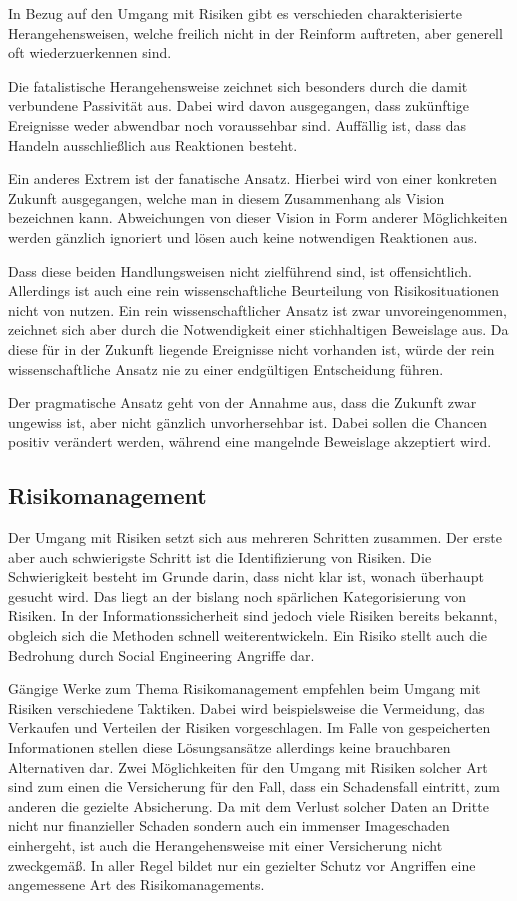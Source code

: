 In Bezug auf den Umgang mit Risiken gibt es verschieden charakterisierte Herangehensweisen, welche
freilich nicht in der Reinform auftreten, aber generell oft wiederzuerkennen sind.

Die fatalistische Herangehensweise zeichnet sich besonders durch die damit verbundene Passivität aus.
Dabei wird davon ausgegangen, dass zukünftige Ereignisse weder abwendbar noch voraussehbar sind.
Auffällig ist, dass das Handeln ausschließlich aus Reaktionen besteht.

Ein anderes Extrem ist der fanatische Ansatz. Hierbei wird von einer konkreten Zukunft ausgegangen,
welche man in diesem Zusammenhang als Vision bezeichnen kann.
Abweichungen von dieser Vision in Form anderer Möglichkeiten werden gänzlich ignoriert und lösen auch
keine notwendigen Reaktionen aus.

Dass diese beiden Handlungsweisen nicht zielführend sind, ist offensichtlich.
Allerdings ist auch eine rein wissenschaftliche Beurteilung von Risikosituationen nicht von nutzen.
Ein rein wissenschaftlicher Ansatz ist zwar unvoreingenommen, zeichnet sich aber durch die
Notwendigkeit einer stichhaltigen Beweislage aus.
Da diese für in der Zukunft liegende Ereignisse nicht vorhanden ist, würde der rein wissenschaftliche
Ansatz nie zu einer endgültigen Entscheidung führen.

Der pragmatische Ansatz geht von der Annahme aus, dass die Zukunft zwar ungewiss ist, aber nicht
gänzlich unvorhersehbar ist.
Dabei sollen die Chancen positiv verändert werden, während eine mangelnde Beweislage akzeptiert wird.
\cite{risikomanagement}

\subsection{Risikomanagement}\label{sec:risikomanagement}
Der Umgang mit Risiken setzt sich aus mehreren Schritten zusammen.
Der erste aber auch schwierigste Schritt ist die Identifizierung von Risiken.
Die Schwierigkeit besteht im Grunde darin, dass nicht klar ist, wonach überhaupt gesucht wird.
Das liegt an der bislang noch spärlichen Kategorisierung von Risiken.
In der Informationssicherheit sind jedoch viele Risiken bereits bekannt, obgleich sich die Methoden
schnell weiterentwickeln.
Ein Risiko stellt auch die Bedrohung durch Social Engineering Angriffe dar.

Gängige Werke zum Thema Risikomanagement empfehlen beim Umgang mit Risiken verschiedene Taktiken.
Dabei wird beispielsweise die Vermeidung, das Verkaufen und Verteilen der Risiken vorgeschlagen.
Im Falle von gespeicherten Informationen stellen diese Lösungsansätze allerdings keine brauchbaren
Alternativen dar.
Zwei Möglichkeiten für den Umgang mit Risiken solcher Art sind zum einen die Versicherung für den
Fall, dass ein Schadensfall eintritt, zum anderen die gezielte Absicherung.
Da mit dem Verlust solcher Daten an Dritte nicht nur finanzieller Schaden sondern auch ein immenser
Imageschaden einhergeht, ist auch die Herangehensweise mit einer Versicherung nicht zweckgemäß.
In aller Regel bildet nur ein gezielter Schutz vor Angriffen eine angemessene Art des
Risikomanagements.


